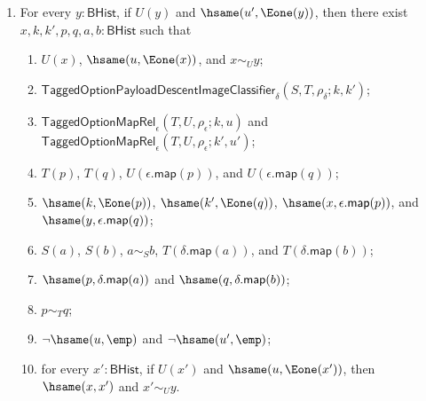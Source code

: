 \begin{theorem}
\begin{enumerate}
\begin{enumerate}
$\hsame(y,\epsilon.\mathsf{map}(q))$;
\item $S(a)$, $S(b)$, $a\sim_S b$, $T(\delta.\mathsf{map}(a))$, and
$T(\delta.\mathsf{map}(b))$;
\item $\hsame(p,\delta.\mathsf{map}(a))$ and
$\hsame(q,\delta.\mathsf{map}(b))$;
\item $p\sim_T q$;
\item $\neg\hsame(u,\emp)$ and $\neg\hsame(u',\emp)$;
\item for every $y':\mathsf{BHist}$, if $U(y')$ and
$\hsame(u',\Eone(y'))$, then $\hsame(y,y')$ and $x\sim_U y'$.
\end{enumerate}
\item For every $y:\mathsf{BHist}$, if $U(y)$ and $\hsame(u',\Eone(y))$, then
there exist $x,k,k',p,q,a,b:\mathsf{BHist}$ such that
\begin{enumerate}
\item $U(x)$, $\hsame(u,\Eone(x))$, and $x\sim_U y$;
\item $\mathsf{TaggedOptionPayloadDescentImageClassifier}_{\delta}
(S,T,\rho_{\delta};k,k')$;
\item $\mathsf{TaggedOptionMapRel}_{\epsilon}(T,U,\rho_{\epsilon};k,u)$ and
$\mathsf{TaggedOptionMapRel}_{\epsilon}(T,U,\rho_{\epsilon};k',u')$;
\item $T(p)$, $T(q)$, $U(\epsilon.\mathsf{map}(p))$, and
$U(\epsilon.\mathsf{map}(q))$;
\item $\hsame(k,\Eone(p))$, $\hsame(k',\Eone(q))$,
$\hsame(x,\epsilon.\mathsf{map}(p))$, and
$\hsame(y,\epsilon.\mathsf{map}(q))$;
\item $S(a)$, $S(b)$, $a\sim_S b$, $T(\delta.\mathsf{map}(a))$, and
$T(\delta.\mathsf{map}(b))$;
\item $\hsame(p,\delta.\mathsf{map}(a))$ and
$\hsame(q,\delta.\mathsf{map}(b))$;
\item $p\sim_T q$;
\item $\neg\hsame(u,\emp)$ and $\neg\hsame(u',\emp)$;
\item for every $x':\mathsf{BHist}$, if $U(x')$ and
$\hsame(u,\Eone(x'))$, then $\hsame(x,x')$ and $x'\sim_U y$.
\end{enumerate}
\end{enumerate}
\end{theorem}
